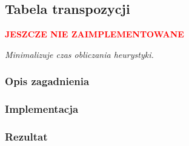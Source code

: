 \subsection{Tabela transpozycji}
\label{subsec:tabela-transpozycji}
\begin{center}
    \textcolor{red}{\textbf{JESZCZE NIE ZAIMPLEMENTOWANE}}
\end{center}
\textit{Minimalizuje czas obliczania heurystyki.}



\subsubsection{Opis zagadnienia}
\subsubsection{Implementacja}
\subsubsection{Rezultat}